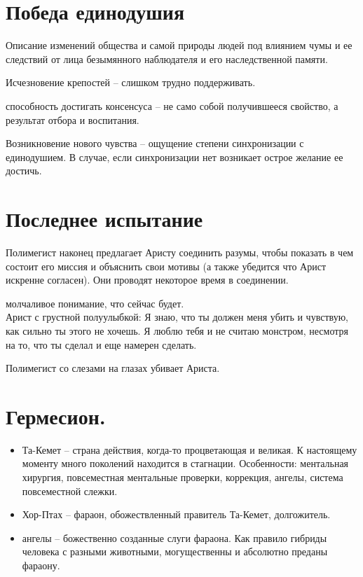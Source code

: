 \documentclass[12pt,a4paper]{article}
\newenvironment{meta}{
\begin{tcolorbox}[breakable, colback=lightgray, colframe=gray]
}{
\end{tcolorbox}
}
\begin{document}
\section*{Победа единодушия}
\begin{meta}
Описание изменений общества и самой природы людей под влиянием чумы и ее следствий от лица безымянного наблюдателя и его наследственной памяти.

Исчезновение крепостей -- слишком трудно поддерживать.

способность достигать консенсуса -- не само собой получившееся свойство, а результат отбора и воспитания.

Возникновение нового чувства -- ощущение степени синхронизации с единодушием. В случае, если синхронизации нет возникает острое желание ее достичь.

\end{meta}


\section*{Последнее испытание}

Полимегист наконец предлагает Аристу соединить разумы, чтобы показать в чем состоит его миссия и объяснить свои мотивы (а также убедится что Арист искренне согласен). Они проводят некоторое время в соединении.

молчаливое понимание, что сейчас будет.\\
Арист с грустной полуулыбкой: Я знаю, что ты должен меня убить и чувствую, как сильно ты этого не хочешь. Я люблю тебя и не считаю монстром, несмотря на то, что ты сделал и еще намерен сделать.

Полимегист со слезами на глазах убивает Ариста.

\section*{Гермесион.}

\begin{itemize}
	\item Та-Кемет -- страна действия, когда-то процветающая и великая. К настоящему моменту много поколений находится в стагнации. Особенности: ментальная хирургия, повсеместная ментальные проверки, коррекция, ангелы, система повсеместной слежки.
	\item Хор-Птах -- фараон, обожествленный правитель Та-Кемет, долгожитель.
	\item ангелы -- божественно созданные слуги фараона. Как правило гибриды человека с разными животными, могущественны и абсолютно преданы фараону.
\end{itemize}
\end{document}
